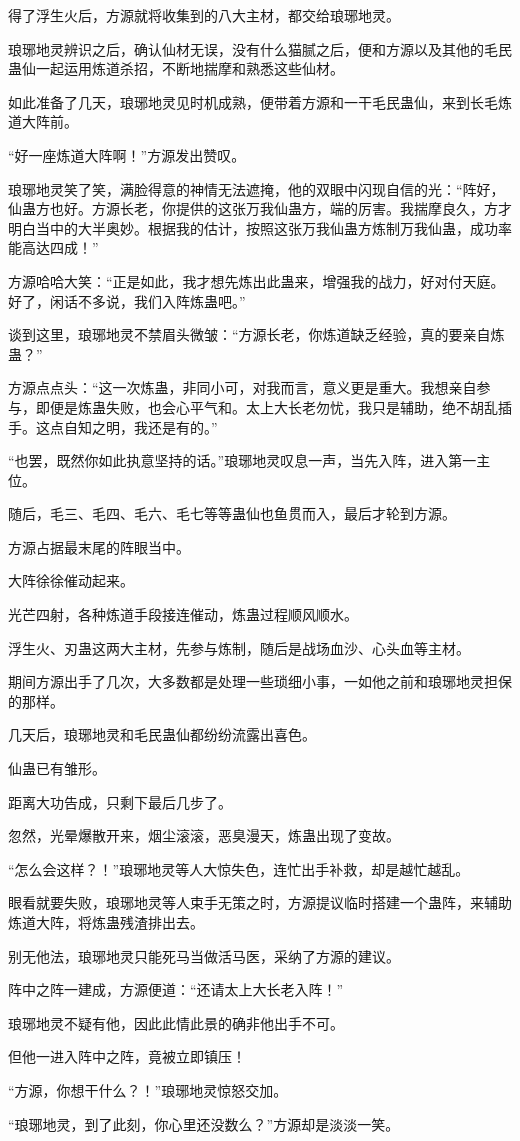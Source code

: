 \begin{this_body}
得了浮生火后，方源就将收集到的八大主材，都交给琅琊地灵。

琅琊地灵辨识之后，确认仙材无误，没有什么猫腻之后，便和方源以及其他的毛民蛊仙一起运用炼道杀招，不断地揣摩和熟悉这些仙材。

如此准备了几天，琅琊地灵见时机成熟，便带着方源和一干毛民蛊仙，来到长毛炼道大阵前。

“好一座炼道大阵啊！”方源发出赞叹。

琅琊地灵笑了笑，满脸得意的神情无法遮掩，他的双眼中闪现自信的光：“阵好，仙蛊方也好。方源长老，你提供的这张万我仙蛊方，端的厉害。我揣摩良久，方才明白当中的大半奥妙。根据我的估计，按照这张万我仙蛊方炼制万我仙蛊，成功率能高达四成！”

方源哈哈大笑：“正是如此，我才想先炼出此蛊来，增强我的战力，好对付天庭。好了，闲话不多说，我们入阵炼蛊吧。”

谈到这里，琅琊地灵不禁眉头微皱：“方源长老，你炼道缺乏经验，真的要亲自炼蛊？”

方源点点头：“这一次炼蛊，非同小可，对我而言，意义更是重大。我想亲自参与，即便是炼蛊失败，也会心平气和。太上大长老勿忧，我只是辅助，绝不胡乱插手。这点自知之明，我还是有的。”

“也罢，既然你如此执意坚持的话。”琅琊地灵叹息一声，当先入阵，进入第一主位。

随后，毛三、毛四、毛六、毛七等等蛊仙也鱼贯而入，最后才轮到方源。

方源占据最末尾的阵眼当中。

大阵徐徐催动起来。

光芒四射，各种炼道手段接连催动，炼蛊过程顺风顺水。

浮生火、刃蛊这两大主材，先参与炼制，随后是战场血沙、心头血等主材。

期间方源出手了几次，大多数都是处理一些琐细小事，一如他之前和琅琊地灵担保的那样。

几天后，琅琊地灵和毛民蛊仙都纷纷流露出喜色。

仙蛊已有雏形。

距离大功告成，只剩下最后几步了。

忽然，光晕爆散开来，烟尘滚滚，恶臭漫天，炼蛊出现了变故。

“怎么会这样？！”琅琊地灵等人大惊失色，连忙出手补救，却是越忙越乱。

眼看就要失败，琅琊地灵等人束手无策之时，方源提议临时搭建一个蛊阵，来辅助炼道大阵，将炼蛊残渣排出去。

别无他法，琅琊地灵只能死马当做活马医，采纳了方源的建议。

阵中之阵一建成，方源便道：“还请太上大长老入阵！”

琅琊地灵不疑有他，因此此情此景的确非他出手不可。

但他一进入阵中之阵，竟被立即镇压！

“方源，你想干什么？！”琅琊地灵惊怒交加。

“琅琊地灵，到了此刻，你心里还没数么？”方源却是淡淡一笑。

\end{this_body}


